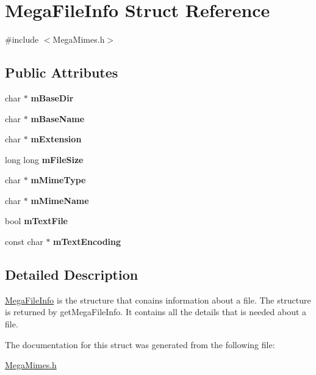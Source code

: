 \hypertarget{structMegaFileInfo}{}\section{Mega\+File\+Info Struct Reference}
\label{structMegaFileInfo}


{\ttfamily \#include $<$Mega\+Mimes.\+h$>$}

\subsection*{Public Attributes}
\begin{DoxyCompactItemize}
\item 
\mbox{\label{structMegaFileInfo_a9632a41d53c3866a7a2b835a9479b6a3}} 
char $\ast$ {\bfseries m\+Base\+Dir}
\item 
\mbox{\label{structMegaFileInfo_aee7b0f815f2d6d5bd4a2af287cbcb276}} 
char $\ast$ {\bfseries m\+Base\+Name}
\item 
\mbox{\label{structMegaFileInfo_adf9d0c4c3a07d74e170bc762373edee2}} 
char $\ast$ {\bfseries m\+Extension}
\item 
\mbox{\label{structMegaFileInfo_ac4ba306aaa247a4520438884dce9e5b2}} 
long long {\bfseries m\+File\+Size}
\item 
\mbox{\label{structMegaFileInfo_aac52815b96528671c36adc8c6f7c0745}} 
char $\ast$ {\bfseries m\+Mime\+Type}
\item 
\mbox{\label{structMegaFileInfo_ade7382973d9f3f8065fdf4d6b7ae3e7f}} 
char $\ast$ {\bfseries m\+Mime\+Name}
\item 
\mbox{\label{structMegaFileInfo_adebd5236c6db3b4d3a675f49b5523e02}} 
bool {\bfseries m\+Text\+File}
\item 
\mbox{\label{structMegaFileInfo_ae2b308b8d3b605889e1320fc0a913a53}} 
const char $\ast$ {\bfseries m\+Text\+Encoding}
\end{DoxyCompactItemize}


\subsection{Detailed Description}
\hyperlink{structMegaFileInfo}{Mega\+File\+Info} is the structure that conains information about a file. The structure is returned by  get\+Mega\+File\+Info. It contains all the details that is needed about a file. 

The documentation for this struct was generated from the following file\+:\begin{DoxyCompactItemize}
\item 
\hyperlink{MegaMimes_8h}{Mega\+Mimes.\+h}\end{DoxyCompactItemize}
